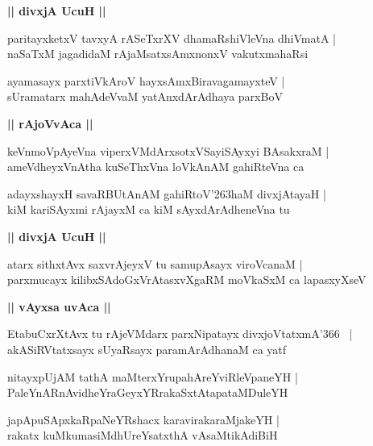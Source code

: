 \documentclass[twoside,12pt,openright]{book}
\def\S{\char'263}
\newcounter{shloka}[chapter]
\def\uvaca#1{\centerline{{\large\textbf{#1}}}}
\begin{document}
\uvaca{|| divxjA UcuH ||}

\begin{shloka}%
paritayxketxV tavxyA rASeTxrXV dhamaRshiVleVna dhiVmatA |\\
naSaTxM jagadidaM rAjaMsatxsAmxnonxV vakutxmahaRsi
\end{shloka}

\begin{shloka}%
ayamasayx parxtiVkAroV hayxsAmxBiravagamayxteV |\\
sUramatarx mahAdeVvaM yatAnxdArAdhaya parxBoV 
\end{shloka}

\uvaca{|| rAjoVvAca ||}

\begin{shloka}%
keVnmoVpAyeVna viperxVMdArxsotxVSayiSAyxyi BAsakxraM |\\
ameVdheyxVnAtha kuSeThxVna loVkAnAM gahiRteVna ca 
\end{shloka}

\begin{shloka}%
adayxshayxH savaRBUtAnAM gahiRtoV\S haM divxjAtayaH |\\
kiM kariSAyxmi rAjayxM ca  kiM sAyxdArAdheneVna tu 
\end{shloka}

\uvaca{|| divxjA UcuH ||}

\begin{shloka}%
atarx sithxtAvx saxvrAjeyxV tu samupAsayx viroVcanaM |\\
parxmucayx kilibxSAdoGxVrAtasxvXgaRM moVkaSxM ca lapasxyXseV
\end{shloka}

\uvaca{|| vAyxsa uvAca ||}

\begin{shloka}%
EtabuCxrXtAvx tu rAjeVMdarx parxNipatayx divxjoVtatxmA\char'366 ~|\\
akASiRVtatxsayx sUyaRsayx paramArAdhanaM ca yatf 
\end{shloka}

\begin{shloka}%
nitayxpUjAM tathA maMterxYrupahAreYviRleVpaneYH |\\
PaleYnARnAvidheYraGeyxYRrakaSxtAtapataMDuleYH 
\end{shloka}

\begin{shloka}%
japApuSApxkaRpaNeYRshacx karavirakaraMjakeYH |\\
rakatx kuMkumasiMdhUreYsatxthA vAsaMtikAdiBiH 
\end{shloka}
\end{document}
